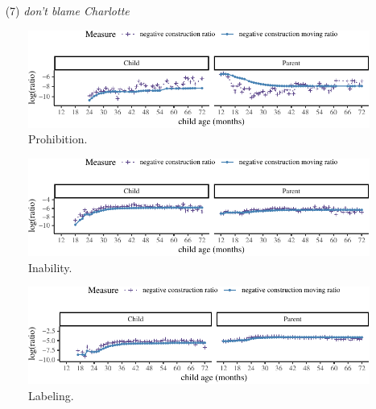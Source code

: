 \documentclass[10pt, letterpaper]{article}
\newenvironment{CodeChunk}{}{}
\begin{document}
~ (7) \emph{don't blame Charlotte}

\begin{figure}[h]

\begin{CodeChunk}


\begin{center}\includegraphics{figs/prohibition-1} \end{center}

\end{CodeChunk}
\caption[This image spans both columns]{Prohibition.}\label{fig:prohibition}
\end{figure}

\begin{figure}[h]

\begin{CodeChunk}


\begin{center}\includegraphics{figs/inability-1} \end{center}

\end{CodeChunk}
\caption[This image spans both columns]{Inability.}\label{fig:inability}
\end{figure}

\begin{figure}[h!]

\begin{CodeChunk}


\begin{center}\includegraphics{figs/learning-1} \end{center}

\end{CodeChunk}
\caption[This image spans both columns]{Labeling.}\label{fig:labeling}
\end{figure}
\end{document}
